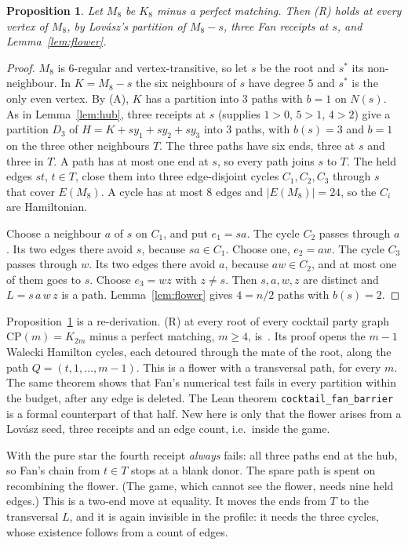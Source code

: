 \documentclass[11pt]{amsart}
\newtheorem{proposition}[theorem]{Proposition}
\theoremstyle{definition}
\begin{document}
\begin{proposition}\label{prop:K8M}
Let $M_8$ be $K_8$ minus a perfect matching. Then (R) holds at every vertex of $M_8$, by
Lov\'asz's partition of $M_8-s$, three Fan receipts at $s$, and Lemma~\ref{lem:flower}.
\end{proposition}
\begin{proof}
$M_8$ is $6$-regular and vertex-transitive, so let $s$ be the root and $s^*$ its non-neighbour. In
$K=M_8-s$ the six neighbours of $s$ have degree $5$ and $s^*$ is the only even vertex. By (A), $K$
has a partition into $3$ paths with $b=1$ on $N(s)$. As in Lemma~\ref{lem:hub}, three receipts at
$s$ (supplies $1>0$, $5>1$, $4>2$) give a partition $D_3$ of $H=K+sy_1+sy_2+sy_3$ into $3$ paths,
with $b(s)=3$ and $b=1$ on the three other neighbours $T$. The three paths have six ends, three at
$s$ and three in $T$. A path has at most one end at $s$, so every path joins $s$ to $T$. The held
edges $st$, $t\in T$, close them into three edge-disjoint cycles $C_1,C_2,C_3$ through $s$ that
cover $E(M_8)$. A cycle has at most $8$ edges and $|E(M_8)|=24$, so the $C_i$ are Hamiltonian.

Choose a neighbour $a$ of $s$ on $C_1$, and put $e_1=sa$. The cycle $C_2$ passes through $a$. Its
two edges there avoid $s$, because $sa\in C_1$. Choose one, $e_2=aw$. The cycle $C_3$ passes
through $w$. Its two edges there avoid $a$, because $aw\in C_2$, and at most one of them goes to
$s$. Choose $e_3=wz$ with $z\ne s$. Then $s,a,w,z$ are distinct and $L=s\,a\,w\,z$ is a path.
Lemma~\ref{lem:flower} gives $4=n/2$ paths with $b(s)=2$.
\end{proof}

Proposition~\ref{prop:K8M} is a re-derivation. (R) at every root of every cocktail party graph
$\mathrm{CP}(m)=K_{2m}$ minus a perfect matching, $m\ge4$, is~\cite[Thm.~10.21]{SP}. Its proof
opens the $m-1$ Walecki Hamilton cycles, each detoured through the mate of the root, along the
path $Q=(t,1,\dots,m-1)$. This is a flower with a transversal path, for every $m$. The same theorem
shows that Fan's numerical test fails in every partition within the budget, after any edge is
deleted. The Lean theorem \texttt{cocktail\_fan\_barrier} is a formal counterpart of that half.
New here is only that the flower arises from a Lov\'asz seed, three receipts and an edge count,
i.e.\ inside the game.

With the pure star the fourth receipt \emph{always} fails: all three paths end at the hub, so Fan's
chain from $t\in T$ stops at a blank donor. The spare path is spent on recombining the flower. (The
game, which cannot see the flower, needs nine held edges.) This is a two-end move at equality. It moves the ends from $T$ to the transversal $L$, and it is again
invisible in the profile: it needs the three cycles, whose existence follows from a count of
edges.
\end{document}
